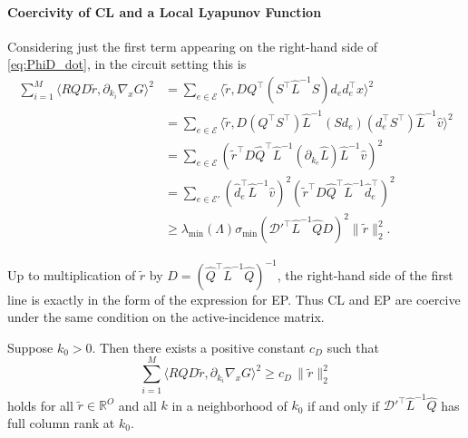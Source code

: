 \documentclass{siamart}
\begin{document}
\paragraph{Coercivity of CL and a Local Lyapunov Function}
Considering just the first term appearing on the right-hand side of \eqref{eq:PhiD_dot}, in the circuit setting this is
\begin{equation}
\begin{aligned}
\sum_{i=1}^M\big\langle R Q D\tilde{r},\partial_{k_i}\nabla_x G\big\rangle^2
& =
   \sum_{e\in \mathcal{E}}\langle  \tilde{r}, DQ^\top (S^\top \hat{L}^{-1}S)d_ed_e^\top x\rangle^2\\
   & = \sum_{e\in \mathcal{E}}\langle  \tilde{r}, D(Q^\top S^\top)  \hat{L}^{-1}(Sd_e)(d_e^\top S^\top) \hat{L}^{-1}\hat{v}\rangle^2\\
   & = \sum_{e \in \mathcal{E}}\left(\tilde{r}^\top D \hat{Q}^\top \hat{L}^{-1}\left(\partial_{k_e}\hat{L} \right)\hat{L}^{-1}\hat{v} \right)^2
\\
& =\sum_{e \in \mathcal{E}'}\left(\hat{d}_e^\top\hat{L}^{-1}\hat{v} \right)^2\left(\tilde{r}^\top D \hat{Q}^\top \hat{L}^{-1}\hat{d}_e^\top \right)^2
\\
&\ge \lambda_{\min}\left(\Lambda\right)\sigma_{\min}\left(\mathscr{D}'^\top \hat{L}^{-1}\hat{Q}D\right)^2\|\tilde{r}\|_2^2.
\end{aligned}
\end{equation}

Up to multiplication of $\tilde{r}$ by $D = (\hat{Q}^\top\hat{L}^{-1}\hat{Q})^{-1}$, the right-hand side of the first line is exactly in the form of the expression for EP. Thus CL and EP are coercive under the same condition on the active-incidence matrix.

\begin{lemma}
\label{lem:CL_coercivity_iff}
Suppose $k_0>0$. Then there exists a positive constant $c_D$ such that
\[
\sum_{i=1}^M\big\langle R Q D\tilde{r},\partial_{k_i}\nabla_x G\big\rangle^2 \geq c_D\,\|\tilde{r}\|_2^2
\]
holds for all $\tilde{r} \in \mathbb{R}^O$ and all $k$ in a neighborhood of $k_0$ if and only if $\mathscr{D}'^\top\hat{L}^{-1}\hat{Q}$ has full column rank at $k_0$.
\end{lemma}
\end{document}
